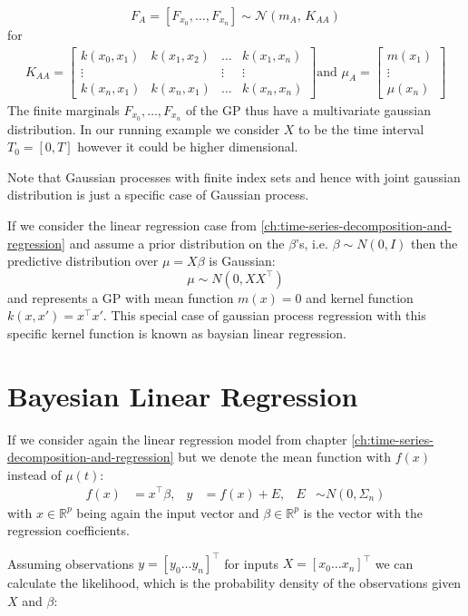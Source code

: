 \[F_A = [F_{x_0}, \dots , F_{x_n}] \sim \mathcal{N}(m_A,\,K_{AA})\]
for
\begin{gather}
    K_{AA} =
    \begin{bmatrix}
        k(x_0, x_1) & k(x_1, x_2) & \dots & k(x_1, x_n)\\
        \vdots  &  & \vdots  & \vdots \\
        k(x_n, x_1)  & k(x_n, x_1) & \dots  & k(x_n, x_n)
    \end{bmatrix} \text{and }
    \mu_A =
    \begin{bmatrix}
        m(x_1) \\
        \vdots \\
        \mu(x_n)
    \end{bmatrix}
\end{gather}
The finite marginals $F_{x_0}, \dots, F_{x_n}$ of the GP thus have a multivariate gaussian distribution.
In our running example we consider $X$ to be the time interval $T_0=[0, T]$ however it could be higher dimensional.

Note that Gaussian processes with finite index sets and hence with joint gaussian distribution is just a specific case
of Gaussian process.

If we consider the linear regression case from \ref{ch:time-series-decomposition-and-regression} and assume a prior distribution
on the $\beta$'s, i.e. $\beta \sim N(0, I)$ then the predictive distribution over $\mu = X \beta$ is Gaussian:
\[
    \mu \sim N(0, XX^{\top})
\]
and represents a GP with mean function $m(x) = 0$ and kernel function $k(x, x') = x^{\top}x'$.
This special case of gaussian process regression with this specific kernel function is known as baysian linear regression.


\section{Bayesian Linear Regression}

If we consider again the linear regression model from chapter \ref{ch:time-series-decomposition-and-regression} but
we denote the mean function with $f(x)$ instead of $\mu(t)$:
\begin{align*}
    f(x) &= x^{\top}\beta, & y &= f(x) + E, & E &\sim N(0, \Sigma_n)
\end{align*}
with $x \in \mathbb{R}^p$ being again the input vector and $\beta \in \mathbb{R}^p$ is the vector with
the regression coefficients.

Assuming observations $y = [y_0 \dots y_n]^{\top}$ for inputs $X = [x_0 \dots x_n]^{\top}$
we can calculate the likelihood,
which is the probability density of the observations given $X$ and $\beta$:

